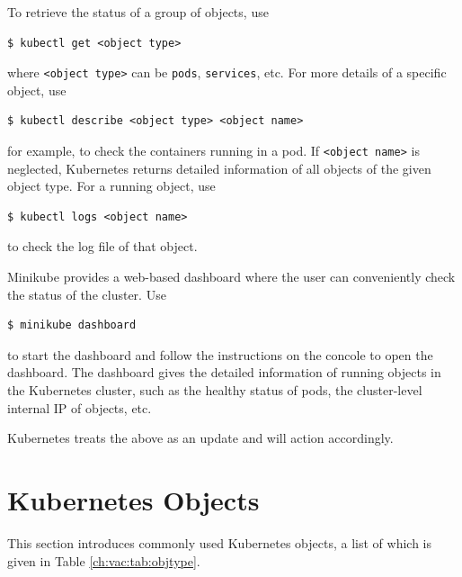 To retrieve the status of a group of objects, use
\begin{lstlisting}
$ kubectl get <object type>
\end{lstlisting}
where \verb|<object type>| can be \verb|pods|, \verb|services|, etc. For more details of a specific object, use
\begin{lstlisting}
$ kubectl describe <object type> <object name>
\end{lstlisting}
for example, to check the containers running in a pod. If \verb|<object name>| is neglected, Kubernetes returns detailed information of all objects of the given object type. For a running object, use
\begin{lstlisting}
$ kubectl logs <object name>
\end{lstlisting}
to check the log file of that object.

Minikube provides a web-based dashboard where the user can conveniently check the status of the cluster. Use
\begin{lstlisting}
$ minikube dashboard
\end{lstlisting} 
to start the dashboard and follow the instructions on the concole to open the dashboard. The dashboard gives the detailed information of running objects in the Kubernetes cluster, such as the healthy status of pods, the cluster-level internal IP of objects, etc.


Kubernetes treats the above as an update and will action accordingly.

\section{Kubernetes Objects} \label{ch:vac:sec:objects}

This section introduces commonly used Kubernetes objects, a list of which is given in Table \ref{ch:vac:tab:objtype}.

